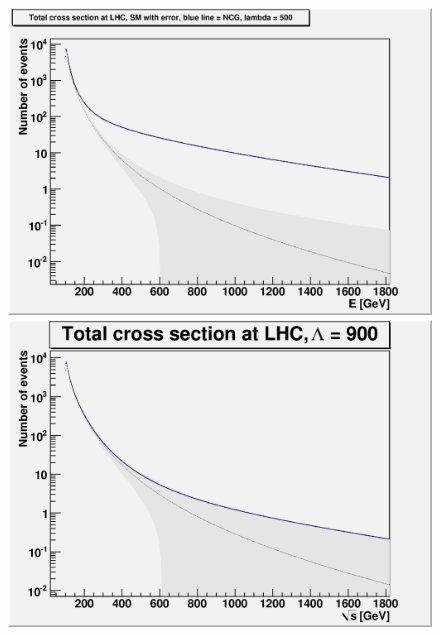 \begin{figure}[h!tp]
	\centering
	\begin{minipage}[b]{0.475\linewidth}
    \centering
	  \includegraphics[scale=0.35]{./images/L500r139.eps}
	\end{minipage}
	\begin{minipage}[b]{0.475\linewidth}
    \centering
	  \includegraphics[scale=0.35]{./images/L900r139.eps}
	\end{minipage}
	\\ \vspace{0.5cm}
	\begin{minipage}[b]{0.475\linewidth}
    \centering

\end{minipage}
\end{figure}
